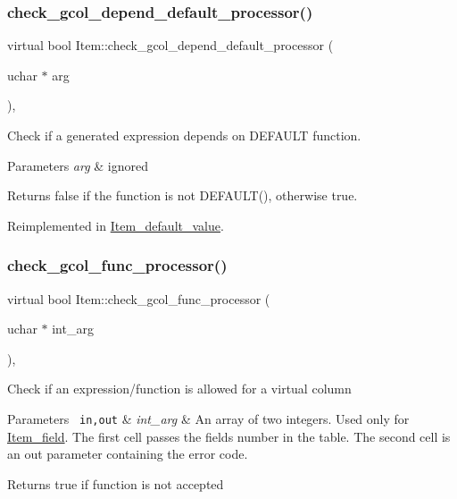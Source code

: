 \subsubsection{\texorpdfstring{check\+\_\+gcol\+\_\+depend\+\_\+default\+\_\+processor()}{check\_gcol\_depend\_default\_processor()}}
{\footnotesize\ttfamily virtual bool Item\+::check\+\_\+gcol\+\_\+depend\+\_\+default\+\_\+processor (\begin{DoxyParamCaption}\item[{uchar $\ast$}]{arg }\end{DoxyParamCaption})\hspace{0.3cm}{\ttfamily [inline]}, {\ttfamily [virtual]}}

Check if a generated expression depends on D\+E\+F\+A\+U\+LT function.


\begin{DoxyParams}{Parameters}
{\em arg} & ignored\\
\hline
\end{DoxyParams}
\begin{DoxyReturn}{Returns}
false if the function is not D\+E\+F\+A\+U\+L\+T(), otherwise true. 
\end{DoxyReturn}


Reimplemented in \mbox{\hyperlink{classItem__default__value_a309bddf86a7472371f02ab9ed80e6b27}{Item\+\_\+default\+\_\+value}}.

\mbox{\label{classItem_af75e3659f732265cbe72824803f208f2}} 
\subsubsection{\texorpdfstring{check\+\_\+gcol\+\_\+func\+\_\+processor()}{check\_gcol\_func\_processor()}}
{\footnotesize\ttfamily virtual bool Item\+::check\+\_\+gcol\+\_\+func\+\_\+processor (\begin{DoxyParamCaption}\item[{uchar $\ast$}]{int\+\_\+arg }\end{DoxyParamCaption})\hspace{0.3cm}{\ttfamily [inline]}, {\ttfamily [virtual]}}

Check if an expression/function is allowed for a virtual column


\begin{DoxyParams}[1]{Parameters}
\mbox{\texttt{ in,out}}  & {\em int\+\_\+arg} & An array of two integers. Used only for \mbox{\hyperlink{classItem__field}{Item\+\_\+field}}. The first cell passes the field\textquotesingle{}s number in the table. The second cell is an out parameter containing the error code.\\
\hline
\end{DoxyParams}
\begin{DoxyReturn}{Returns}
true if function is not accepted 
\end{DoxyReturn}


